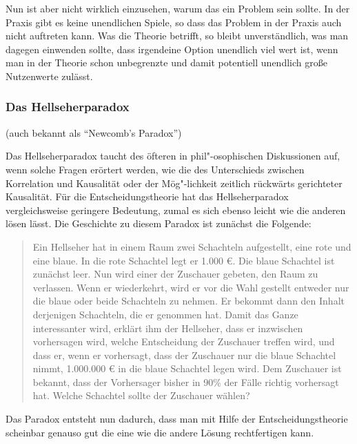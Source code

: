 Nun ist aber nicht wirklich einzusehen, warum das ein Problem sein sollte. In
der Praxis gibt es keine unendlichen Spiele, so dass das Problem in der Praxis
auch nicht auftreten kann. Was die Theorie betrifft, so bleibt unverständlich,
was man dagegen einwenden sollte, dass irgendeine Option unendlich viel wert
ist, wenn man in der Theorie schon unbegrenzte und damit potentiell unendlich
große Nutzenwerte zulässt.
 
\subsubsection{Das Hellseherparadox} (auch bekannt als "`Newcomb's Paradox"')
\label{Hellseherparadox}

Das Hellseherparadox taucht des öfteren in phil"-osophischen Diskussionen
auf, wenn solche Fragen erörtert werden, wie die des Unterschieds zwischen
Korrelation und Kausalität oder der Mög"-lichkeit zeitlich rückwärts gerichteter
Kausalität. Für die Entscheidungstheorie hat das Hellseherparadox
vergleichsweise geringere Bedeutung, zumal es sich ebenso leicht wie die
anderen lösen lässt. Die Geschichte zu diesem Paradox ist zunächst die
Folgende: 

\begin{quotation}
Ein Hellseher hat in einem Raum zwei Schachteln aufgestellt, eine rote und eine blaue. In die rote
Schachtel legt er 1.000 €. Die blaue Schachtel ist zunächst leer. Nun wird
einer der Zuschauer gebeten, den Raum zu verlassen. Wenn er wiederkehrt, wird er
vor die Wahl gestellt entweder nur die blaue oder beide Schachteln zu nehmen.
Er bekommt dann den Inhalt derjenigen Schachteln, die er genommen hat. Damit
das Ganze interessanter wird, erklärt ihm der Hellseher, dass er inzwischen
vorhersagen wird, welche Entscheidung der Zuschauer treffen wird, und dass er,
wenn er vorhersagt, dass der Zuschauer nur die blaue Schachtel nimmt, 1.000.000
€ in die blaue Schachtel legen wird. Dem Zuschauer ist bekannt, dass der
Vorhersager bisher in 90\% der Fälle richtig vorhersagt hat. Welche Schachtel
sollte der Zuschauer wählen? \cite[S. 109]{resnik:1987}
\end{quotation}

Das Paradox entsteht nun dadurch, dass man mit Hilfe der
Entscheidungstheorie scheinbar genauso gut die eine wie die andere Lösung
rechtfertigen kann. 

